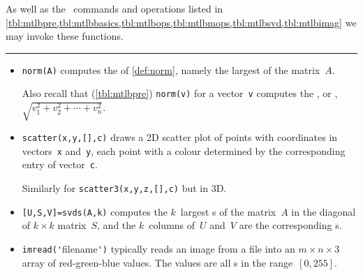 \begin{table}
\caption{As well as the \script\ commands and operations listed in 
\cref{tbl:mtlbpre,tbl:mtlbbasics,tbl:mtlbops,tbl:mtlbmops,tbl:mtlbsvd,tbl:mtlbimag}  we may invoke these functions.} \label{tbl:mtlbnorm}
\smallskip\hrule\smallskip
\begin{minipage}{\linewidth}
\begin{itemize}
\item {}\verb|norm(A)| computes the  of \cref{def:norm}, namely the largest  of the matrix~\(A\).

Also recall that (\cref{tbl:mtlbpre}) \verb|norm(v)| for a vector~\verb|v| computes the , or , \(\sqrt{v_1^2+v_2^2+\cdots+v_n^2}\).



\item {}\verb|scatter(x,y,[],c)| draws a 2D scatter plot of points with coordinates in vectors~\verb|x| and~\verb|y|, each point with a colour determined by the corresponding entry of vector~\verb|c|.  

Similarly for \verb|scatter3(x,y,z,[],c)| but in 3D.

\item {}\verb|[U,S,V]=svds(A,k)| computes the \(k\)~largest s of the matrix~\(A\) in the diagonal of \(k\times k\) matrix~\(S\), and the  \(k\)~columns of~\(U\) and~\(V\) are the corresponding s.


\item  {}\verb|imread('|filename\verb|')| typically reads an image from a file into an \(m\times n\times 3\) array of red-green-blue values. 
The values are all s in the range~\([0,255]\).


\end{itemize}
\end{minipage}
\end{table}
